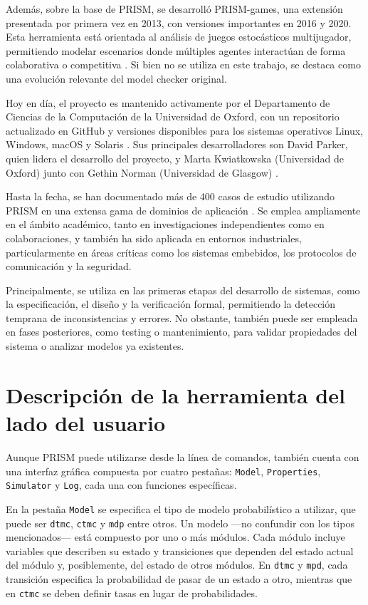 \documentclass[runningheads]{llncs}
\begin{document}
Además, sobre la base de PRISM, se desarrolló PRISM-games, una extensión presentada por primera vez en 2013, con versiones importantes en 2016 y 2020. Esta herramienta está orientada al análisis de juegos estocásticos multijugador, permitiendo modelar escenarios donde múltiples agentes interactúan de forma colaborativa o competitiva \cite{PRISMGames}. Si bien no se utiliza en este trabajo, se destaca como una evolución relevante del model checker original.

Hoy en día, el proyecto es mantenido activamente por el Departamento de Ciencias de la Computación de la Universidad de Oxford, con un repositorio actualizado en GitHub \cite{PRISMGitHub} y versiones disponibles para los sistemas operativos Linux, Windows, macOS y Solaris \cite{PRISMOxford}. Sus principales desarrolladores son David Parker, quien lidera el desarrollo del proyecto, y Marta Kwiatkowska (Universidad de Oxford) junto con Gethin Norman (Universidad de Glasgow) \cite{KNP09a}.

Hasta la fecha, se han documentado más de 400 casos de estudio utilizando PRISM en una extensa gama de dominios de aplicación \cite{KwiatkowskaEtaps2024}. Se emplea ampliamente en el ámbito académico, tanto en investigaciones independientes como en colaboraciones, y también ha sido aplicada en entornos industriales, particularmente en áreas críticas como los sistemas embebidos, los protocolos de comunicación y la seguridad.

Principalmente, se utiliza en las primeras etapas del desarrollo de sistemas, como la especificación, el diseño y la verificación formal, permitiendo la detección temprana de inconsistencias y errores. No obstante, también puede ser empleada en fases posteriores, como testing o mantenimiento, para validar propiedades del sistema o analizar modelos ya existentes.

\section{Descripción de la herramienta del lado del usuario}
Aunque PRISM puede utilizarse desde la línea de comandos, también cuenta con una interfaz gráfica compuesta por cuatro pestañas: \texttt{Model}, \texttt{Properties}, \texttt{Simulator} y \texttt{Log}, cada una con funciones específicas.

En la pestaña \texttt{Model} se especifica el tipo de modelo probabilístico a utilizar, que puede ser \texttt{dtmc}, \texttt{ctmc} y \texttt{mdp} entre otros. Un modelo —no confundir con los tipos mencionados— está compuesto por uno o más módulos. Cada módulo incluye variables que describen su estado y transiciones que dependen del estado actual del módulo y, posiblemente, del estado de otros módulos. En \texttt{dtmc} y \texttt{mpd}, cada transición especifica la probabilidad de pasar de un estado a otro, mientras que en \texttt{ctmc} se deben definir tasas en lugar de probabilidades.
\end{document}
